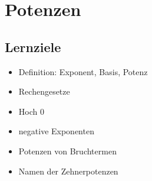 
\section{Potenzen}


\subsection*{Lernziele}

\begin{itemize}
\item Definition: Exponent, Basis, Potenz
\item Rechengesetze
\item Hoch 0
\item negative Exponenten
\item Potenzen von Bruchtermen
\item Namen der Zehnerpotenzen
\end{itemize}
\newpage







